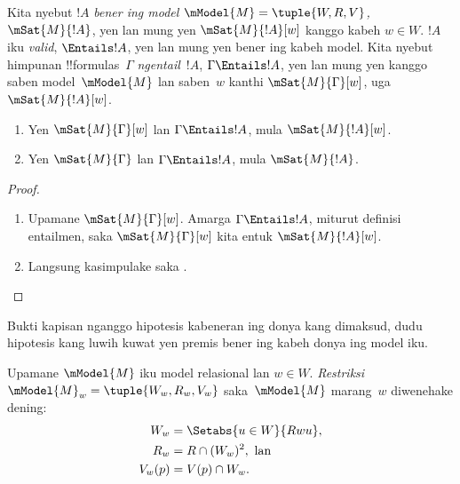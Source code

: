 \documentclass[../../../include/open-logic-section]{subfiles}
\begin{document}


\begin{defn}
  Kita nyebut $!A$ \emph{bener ing model $\mModel{M} = \tuple{W,R,V}$,} $
  \mSat{M}{!A}$, yen lan mung yen $\mSat{M}{!A}[w]$ kanggo kabeh $w \in W$.
  $!A$ iku \emph{valid}, $\Entails !A$, yen lan mung yen bener ing kabeh model.
  Kita nyebut himpunan !!{formula}s~$\Gamma$ \emph{ngentail}~$!A$, $\Gamma
  \Entails !A$, yen lan mung yen kanggo saben model~$\mModel{M}$ lan
  saben~$w$ kanthi $\mSat{M}{\Gamma}[w]$, uga $\mSat{M}{!A}[w]$.
\end{defn}

\begin{prop}
  \begin{enumerate}
  \item{} Yen $\mSat{M}{\Gamma}[w]$ lan
    $\Gamma \Entails !A$, mula $\mSat{M}{!A}[w]$.
  \item{} Yen $\mSat{M}{\Gamma}$ lan $\Gamma
    \Entails !A$, mula $\mSat{M}{!A}$.
  \end{enumerate}
\end{prop}

\begin{proof}
  \begin{enumerate}
  \item Upamane $\mSat{M}{\Gamma}[w]$. Amarga $\Gamma \Entails !A$,
    miturut definisi entailmen, saka $\mSat{M}{\Gamma}[w]$ kita
    entuk $\mSat{M}{!A}[w]$.
  \item Langsung kasimpulake saka .
  \end{enumerate}
\end{proof}
Bukti kapisan nganggo hipotesis kabeneran ing donya kang dimaksud, dudu hipotesis kang luwih kuwat yen premis bener ing kabeh donya ing model iku.


\begin{defn}
  Upamane $\mModel{M}$ iku model relasional lan $w \in W$.
  \emph{Restriksi} $\mModel{M}_w=\tuple{W_w, R_w, V_w}$
  saka~$\mModel{M}$ marang~$w$ diwenehake dening:
  \begin{align*}
    W_w & = \Setabs{u \in W}{Rwu},\\
    R_w  & = R \cap (W_w)^2, \text{ lan}\\
    V_w(p) & = V(p) \cap W_w.
  \end{align*}
\end{defn}
\end{document}

